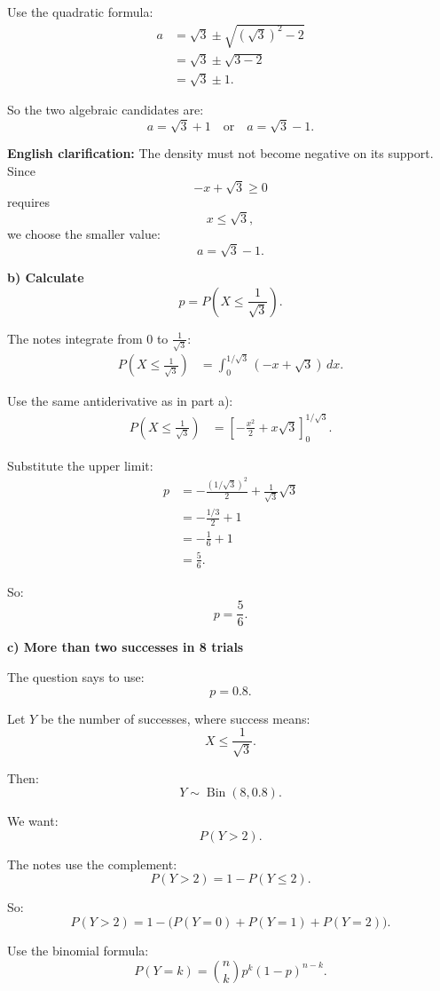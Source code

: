 \documentclass[10pt]{article}
\begin{document}
Use the quadratic formula:
\begin{align*}
a
&=
\sqrt{3}
\pm
\sqrt{(\sqrt{3})^2-2}
\\[2mm]
&=
\sqrt{3}
\pm
\sqrt{3-2}
\\[2mm]
&=
\sqrt{3}\pm 1.
\end{align*}

So the two algebraic candidates are:
\[
a=\sqrt{3}+1
\quad\text{or}\quad
a=\sqrt{3}-1.
\]

\textbf{English clarification:}
The density must not become negative on its support.
Since
\[
-x+\sqrt{3}\ge 0
\]
requires
\[
x\le \sqrt{3},
\]
we choose the smaller value:
\[
a=\sqrt{3}-1.
\]

\textbf{b) Calculate}
\[
p=P\left(X\le \frac{1}{\sqrt{3}}\right).
\]

The notes integrate from \(0\) to
\(\frac{1}{\sqrt{3}}\):
\begin{align*}
P\left(X\le \frac{1}{\sqrt{3}}\right)
&=
\int_0^{1/\sqrt{3}}
(-x+\sqrt{3})\,dx.
\end{align*}

Use the same antiderivative as in part a):
\begin{align*}
P\left(X\le \frac{1}{\sqrt{3}}\right)
&=
\left[
-\frac{x^2}{2}
+x\sqrt{3}
\right]_0^{1/\sqrt{3}}.
\end{align*}

Substitute the upper limit:
\begin{align*}
p
&=
-
\frac{(1/\sqrt{3})^2}{2}
+
\frac{1}{\sqrt{3}}\sqrt{3}
\\[2mm]
&=
-
\frac{1/3}{2}
+1
\\[2mm]
&=
-\frac{1}{6}
+1
\\[2mm]
&=
\frac{5}{6}.
\end{align*}

So:
\[
p=\frac{5}{6}.
\]

\textbf{c) More than two successes in 8 trials}

The question says to use:
\[
p=0.8.
\]

Let \(Y\) be the number of successes, where success
means:
\[
X\le \frac{1}{\sqrt{3}}.
\]

Then:
\[
Y\sim \operatorname{Bin}(8,0.8).
\]

We want:
\[
P(Y>2).
\]

The notes use the complement:
\[
P(Y>2)=1-P(Y\le 2).
\]

So:
\[
P(Y>2)
=
1-
\bigl(
P(Y=0)+P(Y=1)+P(Y=2)
\bigr).
\]

Use the binomial formula:
\[
P(Y=k)
=
\binom{n}{k}
p^k(1-p)^{n-k}.
\]
\end{document}
